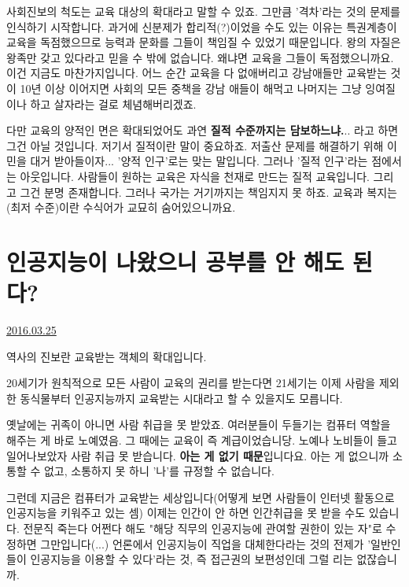 사회진보의 척도는 교육 대상의 확대라고 말할 수 있죠. 그만큼 '격차'라는 것의 문제를 인식하기 시작합니다.
과거에 신분제가 합리적(?)이었을 수도 있는 이유는 특권계층이 교육을 독점했으므로 능력과 문화를 그들이 책임질 수 있었기 때문입니다.
왕의 자질은 왕족만 갖고 있다라고 믿을 수 밖에 없습니다. 왜냐면 교육을 그들이 독점했으니까요.
이건 지금도 마찬가지입니다. 어느 순간 교육을 다 없애버리고 강남애들만 교육받는 것이 10년 이상 이어지면
사회의 모든 중책을 강남 애들이 해먹고 나머지는 그냥 잉여질이나 하고 살자라는 걸로 체념해버리겠죠.
\vspace{5mm}

다만 교육의 양적인 면은 확대되었어도 과연 \textbf{질적 수준까지는 담보하느냐.}.. 라고 하면 그건 아닐 것입니다.
저기서 질적이란 말이 중요하죠. 저출산 문제를 해결하기 위해 이민을 대거 받아들이자... '양적 인구'로는 맞는 말입니다.
그러나 '질적 인구'라는 점에서는 아웃입니다.
사람들이 원하는 교육은 자식을 천재로 만드는 질적 교육입니다. 그리고 그건 분명 존재합니다.
그러나 국가는 거기까지는 책임지지 못 하죠. 교육과 복지는 (최저 수준)이란 수식어가 교묘히 숨어있으니까요.
\vspace{5mm}







\section{인공지능이 나왔으니 공부를 안 해도 된다?}
\href{https://www.kockoc.com/Apoc/694058}{2016.03.25}

\vspace{5mm}

역사의 진보란 교육받는 객체의 확대입니다.
\vspace{5mm}

20세기가 원칙적으로 모든 사람이 교육의 권리를 받는다면
21세기는 이제 사람을 제외한 동식물부터 인공지능까지 교육받는 시대라고 할 수 있을지도 모릅니다.
\vspace{5mm}

옛날에는 귀족이 아니면 사람 취급을 못 받았죠. 여러분들이 두들기는 컴퓨터 역할을 해주는 게 바로 노예였음.
그 때에는 교육이 즉 계급이었습니당.
노예나 노비들이 들고 일어나보았자 사람 취급 못 받습니다. \textbf{아는 게 없기 때문}입니다요.
아는 게 없으니까 소통할 수 없고, 소통하지 못 하니 '나'를 규정할 수 없습니다.
\vspace{5mm}

그런데 지금은 컴퓨터가 교육받는 세상입니다(어떻게 보면 사람들이 인터넷 활동으로 인공지능을 키워주고 있는 셈)
이제는 인간이 안 하면 인간취급을 못 받을 수도 있습니다.
전문직 죽는다 어쩐다 해도 "해당 직무의 인공지능에 관여할 권한이 있는 자"로 수정하면 그만입니다(...)
언론에서 인공지능이 직업을 대체한다라는 것의 전제가
'일반인들이 인공지능을 이용할 수 있다'라는 것, 즉 접근권의 보편성인데  그럴 리는 없잖습니까.
\vspace{5mm}



